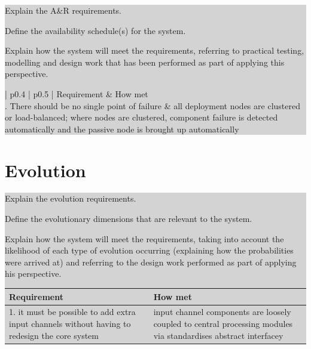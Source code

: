 \documentclass[a4paper,11pt]{report}
\newcommand{\instructions}[1]{
  \noindent\colorbox{lightgray}{%
    \parbox{\linewidth}{%
      #1
    }%
  }%
 \vspace{0.1cm}
}
\begin{document}
\instructions{
Explain the A\&R requirements.

Define the availability schedule(s) for the system.

Explain how the system will meet the requirements, referring to
practical testing, modelling and design work that has been performed
as part of applying this perspective.

\begin{center}
  \begin{tabular}[h!]{| p{0.4\textwidth} | p{0.5\textwidth} |}
    \hline
    \rowcolor{gray}
    Requirement & How met \\
    \hline
    \hline
    1. There should be no single point of failure & all deployment
    nodes are clustered or load-balanced; where nodes are clustered,
    component failure is detected automatically and the passive node
    is brought up automatically\\

    \hline
 \end{tabular}
\end{center}

}


\section{Evolution}
\label{sec:evolution}

\instructions{
Explain the evolution requirements.

Define the evolutionary dimensions that are relevant to the system.

Explain  how the system will meet the requirements, taking into
account the likelihood of each type of evolution occurring (explaining
how the probabilities were arrived at) and referring to the design
work performed as part of applying his perspective.

\begin{center}
  \begin{tabular}[h!]{| p{0.4\textwidth} | p{0.5\textwidth} |}
    \hline
    \rowcolor{gray}
    Requirement & How met \\
    \hline
    \hline
    1. it must be possible to add extra input channels without having
    to redesign the core system & input channel components are loosely
    coupled to central processing modules via standardises abstract
    interfacey\\

    \hline
 \end{tabular}
\end{center}
}
\end{document}
